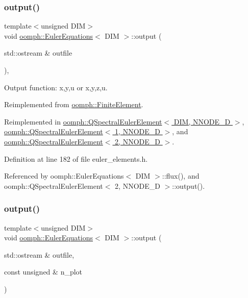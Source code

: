 \subsubsection{\texorpdfstring{output()}{output()}\hspace{0.1cm}{\footnotesize\ttfamily [1/2]}}
{\footnotesize\ttfamily template$<$unsigned D\+IM$>$ \\
void \hyperlink{classoomph_1_1EulerEquations}{oomph\+::\+Euler\+Equations}$<$ D\+IM $>$\+::output (\begin{DoxyParamCaption}\item[{std\+::ostream \&}]{outfile }\end{DoxyParamCaption})\hspace{0.3cm}{\ttfamily [inline]}, {\ttfamily [virtual]}}



Output function\+: x,y,u or x,y,z,u. 



Reimplemented from \hyperlink{classoomph_1_1FiniteElement_a2ad98a3d2ef4999f1bef62c0ff13f2a7}{oomph\+::\+Finite\+Element}.



Reimplemented in \hyperlink{classoomph_1_1QSpectralEulerElement_ae3771a5f57f21d3a97595856b089e467}{oomph\+::\+Q\+Spectral\+Euler\+Element$<$ D\+I\+M, N\+N\+O\+D\+E\+\_\+D $>$}, \hyperlink{classoomph_1_1QSpectralEulerElement_ae3771a5f57f21d3a97595856b089e467}{oomph\+::\+Q\+Spectral\+Euler\+Element$<$ 1, N\+N\+O\+D\+E\+\_\+D $>$}, and \hyperlink{classoomph_1_1QSpectralEulerElement_ae3771a5f57f21d3a97595856b089e467}{oomph\+::\+Q\+Spectral\+Euler\+Element$<$ 2, N\+N\+O\+D\+E\+\_\+D $>$}.



Definition at line 182 of file euler\+\_\+elements.\+h.



Referenced by oomph\+::\+Euler\+Equations$<$ D\+I\+M $>$\+::flux(), and oomph\+::\+Q\+Spectral\+Euler\+Element$<$ 2, N\+N\+O\+D\+E\+\_\+D $>$\+::output().

\mbox{\label{classoomph_1_1EulerEquations_a9d51d5bcc096341b6f73353d87def5b3}} 
\subsubsection{\texorpdfstring{output()}{output()}\hspace{0.1cm}{\footnotesize\ttfamily [2/2]}}
{\footnotesize\ttfamily template$<$unsigned D\+IM$>$ \\
void \hyperlink{classoomph_1_1EulerEquations}{oomph\+::\+Euler\+Equations}$<$ D\+IM $>$\+::output (\begin{DoxyParamCaption}\item[{std\+::ostream \&}]{outfile,  }\item[{const unsigned \&}]{n\+\_\+plot }\end{DoxyParamCaption})\hspace{0.3cm}{\ttfamily [virtual]}}



